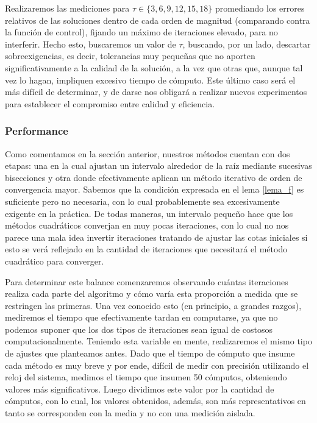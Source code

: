 Realizaremos las mediciones para $\tau \in \{3,6,9,12,15, 18\}$ promediando los errores relativos de las soluciones dentro de cada orden de magnitud (comparando contra la función de control), fijando un máximo de iteraciones elevado, para no interferir. Hecho esto, buscaremos un valor de $\tau$, buscando, por un lado, descartar sobreexigencias, es decir, tolerancias muy pequeñas que no aporten significativamente a la calidad de la solución, a la vez que otras que, aunque tal vez lo hagan, impliquen excesivo tiempo de cómputo. Este último caso será el más difícil de determinar, y de darse nos 
obligará a realizar nuevos experimentos para establecer el compromiso entre calidad y eficiencia.

	\subsubsection{Performance}
Como comentamos en la sección anterior, nuestros métodos cuentan con dos etapas: una en la cual ajustan un intervalo alrededor de la raíz mediante sucesivas bisecciones y otra donde efectivamente aplican un método iterativo de orden de convergencia mayor. Sabemos que la condición expresada en el lema \ref{lema_f} es suficiente pero no necesaria, con lo cual probablemente sea excesivamente exigente en la práctica. De todas maneras, un intervalo pequeño hace que los métodos cuadráticos converjan en muy pocas iteraciones, con lo cual no nos parece una mala idea invertir iteraciones tratando de ajustar las cotas iniciales si esto se verá reflejado en la cantidad de iteraciones que necesitará el método cuadrático para converger.

Para determinar este balance comenzaremos observando cuántas iteraciones realiza cada parte del algoritmo y cómo varía esta proporción a medida que se restringen las primeras. Una vez conocido esto (en principio, a grandes razgos), mediremos el tiempo que efectivamente tardan en computarse, ya que no podemos suponer que los dos tipos de iteraciones sean igual de costosos computacionalmente. Teniendo esta variable en mente, realizaremos el mismo tipo de ajustes que planteamos antes. Dado que el tiempo de cómputo que insume cada método es muy breve y por ende, difícil de medir con precisión utilizando el reloj del sistema, medimos el tiempo que insumen 50 cómputos, obteniendo valores más significativos. Luego dividimos este valor por la cantidad de cómputos, con lo cual, los valores obtenidos, además, son más representativos en tanto se corresponden con la media y no con una medición aislada. 

